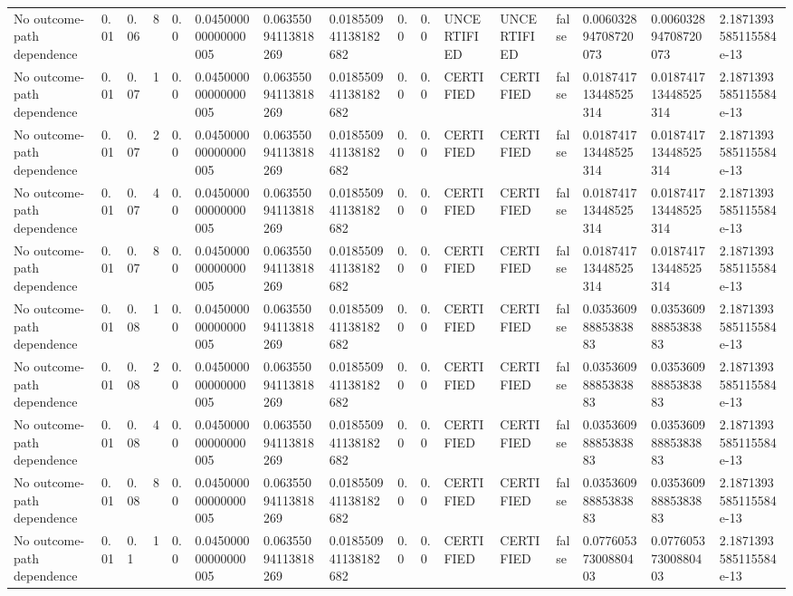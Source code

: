 \begin{tabular}{llllllllllllllll}
No outcome-path dependence & 0.01 & 0.06 & 8 & 0.0 & 0.045000000000000005 & 0.06355094113818269 & 0.018550941138182682 & 0.0 & 0.0 & UNCERTIFIED & UNCERTIFIED & false & 0.006032894708720073 & 0.006032894708720073 & 2.1871393585115584e-13 \\
No outcome-path dependence & 0.01 & 0.07 & 1 & 0.0 & 0.045000000000000005 & 0.06355094113818269 & 0.018550941138182682 & 0.0 & 0.0 & CERTIFIED & CERTIFIED & false & 0.018741713448525314 & 0.018741713448525314 & 2.1871393585115584e-13 \\
No outcome-path dependence & 0.01 & 0.07 & 2 & 0.0 & 0.045000000000000005 & 0.06355094113818269 & 0.018550941138182682 & 0.0 & 0.0 & CERTIFIED & CERTIFIED & false & 0.018741713448525314 & 0.018741713448525314 & 2.1871393585115584e-13 \\
No outcome-path dependence & 0.01 & 0.07 & 4 & 0.0 & 0.045000000000000005 & 0.06355094113818269 & 0.018550941138182682 & 0.0 & 0.0 & CERTIFIED & CERTIFIED & false & 0.018741713448525314 & 0.018741713448525314 & 2.1871393585115584e-13 \\
No outcome-path dependence & 0.01 & 0.07 & 8 & 0.0 & 0.045000000000000005 & 0.06355094113818269 & 0.018550941138182682 & 0.0 & 0.0 & CERTIFIED & CERTIFIED & false & 0.018741713448525314 & 0.018741713448525314 & 2.1871393585115584e-13 \\
No outcome-path dependence & 0.01 & 0.08 & 1 & 0.0 & 0.045000000000000005 & 0.06355094113818269 & 0.018550941138182682 & 0.0 & 0.0 & CERTIFIED & CERTIFIED & false & 0.03536098885383883 & 0.03536098885383883 & 2.1871393585115584e-13 \\
No outcome-path dependence & 0.01 & 0.08 & 2 & 0.0 & 0.045000000000000005 & 0.06355094113818269 & 0.018550941138182682 & 0.0 & 0.0 & CERTIFIED & CERTIFIED & false & 0.03536098885383883 & 0.03536098885383883 & 2.1871393585115584e-13 \\
No outcome-path dependence & 0.01 & 0.08 & 4 & 0.0 & 0.045000000000000005 & 0.06355094113818269 & 0.018550941138182682 & 0.0 & 0.0 & CERTIFIED & CERTIFIED & false & 0.03536098885383883 & 0.03536098885383883 & 2.1871393585115584e-13 \\
No outcome-path dependence & 0.01 & 0.08 & 8 & 0.0 & 0.045000000000000005 & 0.06355094113818269 & 0.018550941138182682 & 0.0 & 0.0 & CERTIFIED & CERTIFIED & false & 0.03536098885383883 & 0.03536098885383883 & 2.1871393585115584e-13 \\
No outcome-path dependence & 0.01 & 0.1 & 1 & 0.0 & 0.045000000000000005 & 0.06355094113818269 & 0.018550941138182682 & 0.0 & 0.0 & CERTIFIED & CERTIFIED & false & 0.07760537300880403 & 0.07760537300880403 & 2.1871393585115584e-13 \\

\end{tabular}
